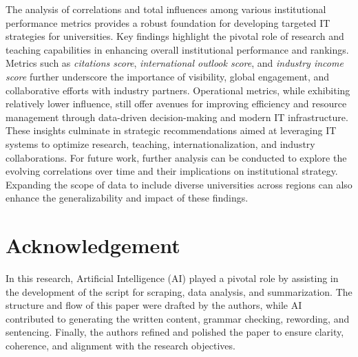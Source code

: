 \documentclass[conference]{IEEEtran}
\begin{document}
The analysis of correlations and total influences among various institutional performance metrics provides a robust foundation for developing targeted IT strategies for universities. Key findings highlight the pivotal role of research and teaching capabilities in enhancing overall institutional performance and rankings. Metrics such as \textit{citations score}, \textit{international outlook score}, and \textit{industry income score} further underscore the importance of visibility, global engagement, and collaborative efforts with industry partners. Operational metrics, while exhibiting relatively lower influence, still offer avenues for improving efficiency and resource management through data-driven decision-making and modern IT infrastructure. These insights culminate in strategic recommendations aimed at leveraging IT systems to optimize research, teaching, internationalization, and industry collaborations. For future work, further analysis can be conducted to explore the evolving correlations over time and their implications on institutional strategy. Expanding the scope of data to include diverse universities across regions can also enhance the generalizability and impact of these findings. 


\section*{Acknowledgement}

In this research, Artificial Intelligence (AI) played a pivotal role by assisting in the development of the script for scraping, data analysis, and summarization. The structure and flow of this paper were drafted by the authors, while AI contributed to generating the written content, grammar checking, rewording, and sentencing. Finally, the authors refined and polished the paper to ensure clarity, coherence, and alignment with the research objectives.



\end{document}
